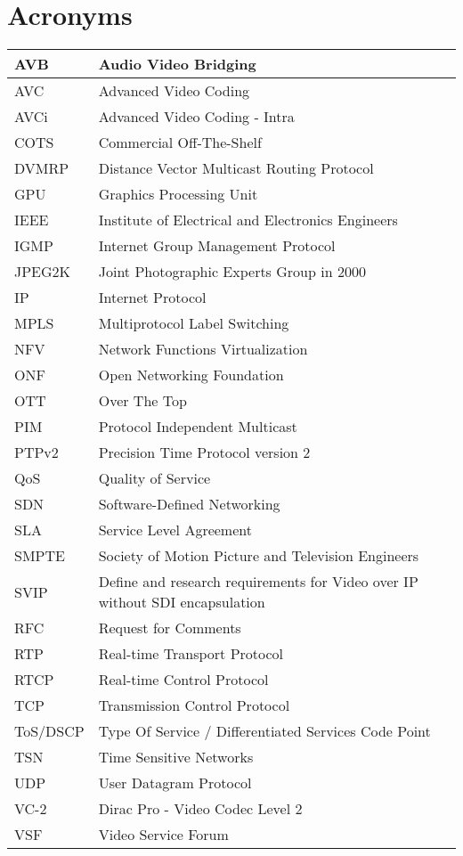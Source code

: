 \cleardoublepage
{}
\chapter*{Acronyms}

\begin{table*}[htb]
\centering
\begin{tabular}{p{} p{}}
\hline
AVB & Audio Video Bridging \\
\hline
AVC & Advanced Video Coding \\
\hline
AVCi & Advanced Video Coding - Intra \\
\hline
COTS & Commercial Off-The-Shelf \\
\hline
DVMRP & Distance Vector Multicast Routing Protocol \\
\hline
GPU & Graphics Processing Unit \\
\hline
IEEE & Institute of Electrical and Electronics Engineers \\
\hline
IGMP & Internet Group Management Protocol \\
\hline
JPEG2K &  Joint Photographic Experts Group in 2000\\
\hline
IP & Internet Protocol \\
\hline
MPLS & Multiprotocol Label Switching \\
\hline
NFV & Network Functions Virtualization \\
\hline
ONF & Open Networking Foundation \\
\hline
OTT & Over The Top \\
\hline
PIM & Protocol Independent Multicast \\
\hline
PTPv2 & Precision Time Protocol version 2 \\
\hline
QoS & Quality of Service \\
\hline
SDN & Software-Defined Networking \\
\hline
SLA & Service Level Agreement \\
\hline
SMPTE & Society of Motion Picture and Television Engineers \\
\hline
SVIP & Define and research requirements for Video over IP without SDI encapsulation \\
\hline
RFC & Request for Comments \\
\hline
RTP & Real-time Transport Protocol \\
\hline
RTCP & Real-time Control Protocol  \\
\hline
TCP & Transmission Control Protocol \\
\hline
ToS/DSCP & Type Of Service / Differentiated Services Code Point \\
\hline
TSN & Time Sensitive Networks \\
\hline
UDP & User Datagram Protocol \\
\hline
VC-2 & Dirac Pro - Video Codec Level 2 \\
\hline
VSF & Video Service Forum \\ 
\hline
\end{tabular}
\end{table*}


